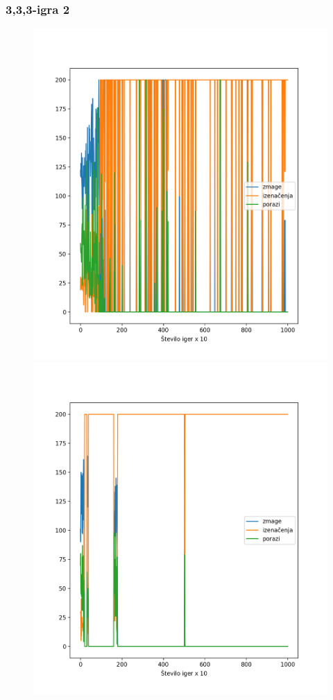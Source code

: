 \documentclass{beamer}    %
\begin{document}
\begin{frame}
    \frametitle{3,3,3-igra 2}
    \begin{figure}
        \includegraphics[scale=0.29]{slike/td-bulsit.png}
        \includegraphics[scale=0.29]{slike/semi-razumljiv-agent.png}
    \end{figure}
\end{frame}
\end{document}
